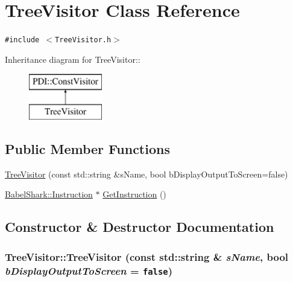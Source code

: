 \hypertarget{class_tree_visitor}{
\section{TreeVisitor Class Reference}
\label{class_tree_visitor}
}
{\tt \#include $<$TreeVisitor.h$>$}

Inheritance diagram for TreeVisitor::\begin{figure}[H]
\begin{center}
\leavevmode
\includegraphics[height=2cm]{class_tree_visitor}
\end{center}
\end{figure}
\subsection*{Public Member Functions}
\begin{CompactItemize}
\item 
\hyperlink{class_tree_visitor_83c6b4c595156e7364646894e8063d4d}{TreeVisitor} (const std::string \&sName, bool bDisplayOutputToScreen=false)
\item 
\hyperlink{class_babel_shark_1_1_instruction}{BabelShark::Instruction} $\ast$ \hyperlink{class_tree_visitor_5aec3878d33d8942c16e1cfe38ca9371}{GetInstruction} ()
\end{CompactItemize}


\subsection{Constructor \& Destructor Documentation}
\hypertarget{class_tree_visitor_83c6b4c595156e7364646894e8063d4d}{
\subsubsection[{TreeVisitor}]{\setlength{\rightskip}{0pt plus 5cm}TreeVisitor::TreeVisitor (const std::string \& {\em sName}, \/  bool {\em bDisplayOutputToScreen} = {\tt false})}}
\label{class_tree_visitor_83c6b4c595156e7364646894e8063d4d}




